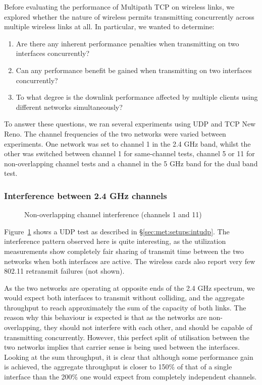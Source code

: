 Before evaluating the performance of Multipath TCP on wireless links, we
explored whether the nature of wireless permits transmitting
concurrently across multiple wireless links at all. In particular, we wanted
to determine:

\begin{enumerate}
  \item Are there any inherent performance penalties when transmitting on two
    interfaces concurrently?
  \item Can any performance benefit be gained when transmitting on two
    interfaces concurrently?
  \item To what degree is the downlink performance affected by multiple clients
    using different networks simultaneously?
\end{enumerate}

To answer these questions, we ran several experiments using UDP and TCP New 
Reno.
The channel frequencies of the two networks were varied between experiments. One
network was set to channel 1 in the 2.4 GHz band, whilst the other
was switched between channel 1 for same-channel tests, channel 5 or 11 for
non-overlapping channel tests and a channel in the 5 GHz band for the dual band 
test. 

\subsubsection{Interference between 2.4 GHz channels}

\begin{figure}[h]
 \centering
 
 \caption{Non-overlapping channel interference (channels 1 and 11)}\label{graph:cc-interference}
\end{figure}

Figure~\ref{graph:cc-interference} shows a UDP test as described in 
\S\ref{sec:met:setups:intudp}.
The interference pattern observed here is quite interesting, as the
utilization measurements show completely fair sharing of transmit time
between the two networks when both interfaces are active. The
wireless cards also report very few 802.11 retransmit failures (not shown).

As the two networks are operating at opposite ends of the 2.4 GHz spectrum, we
would expect both interfaces to transmit without colliding,
and the aggregate throughput to reach approximately the sum of the capacity of
both links. The reason why this behaviour is expected is that as the networks are non-overlapping, they should not interfere with each other, and
should be capable of transmitting concurrently. However, this perfect split of
utilisation between the two networks implies that carrier sense is being used between the interfaces.
Looking at the sum throughput, it is clear that although some performance gain is
achieved, the aggregate throughput is closer to 150\% of that of a single
interface than the 200\% one would expect from completely independent channels.

